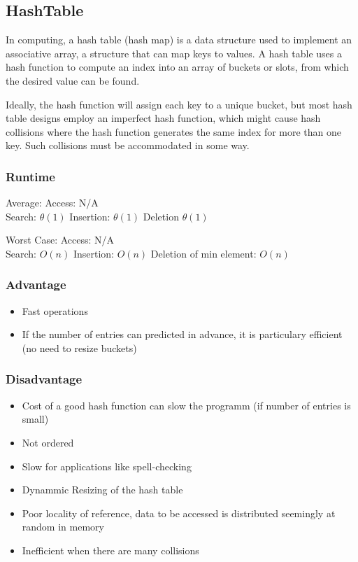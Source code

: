 \documentclass[12pt,a4paper]{article}
\newcommand{\RuntimeHead}{Runtime}
\newcommand{\AdvantageHead}{Advantage}
\newcommand{\DisadvantageHead}{Disadvantage}
\begin{document}
\subsection{HashTable}
In computing, a hash table (hash map) is a data structure used to implement an associative array, a structure that can map keys to values. A hash table uses a hash function to compute an index into an array of buckets or slots, from which the desired value can be found.

Ideally, the hash function will assign each key to a unique bucket, but most hash table designs employ an imperfect hash function, which might cause hash collisions where the hash function generates the same index for more than one key. Such collisions must be accommodated in some way.
\subsubsection{\RuntimeHead}
Average: 
Access: N/A\\
Search: $\theta(1) $
Insertion: $ \theta(1)$ 
Deletion $\theta (1)$ 

Worst Case: 
Access:  N/A\\
Search: $O( n) $
Insertion: $O(n)$ 
Deletion of min element: $O(n)$ 
\subsubsection{\AdvantageHead}
\begin{itemize}
\item Fast operations
\item If the number of entries can predicted in advance, it is particulary efficient (no need to resize buckets)
\end{itemize}
\subsubsection{\DisadvantageHead}
\begin{itemize}
\item Cost of a good hash function can slow the programm (if number of entries is small)
\item Not ordered
\item Slow for applications like spell-checking
\item Dynammic Resizing of the hash table
\item Poor locality of reference, data  to be accessed is distributed seemingly at random in memory
\item Inefficient when there are many collisions
\end{itemize}
\end{document}

